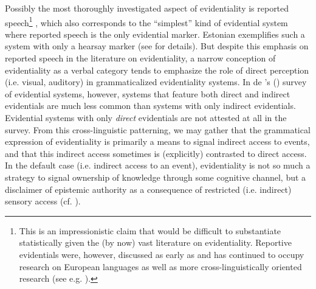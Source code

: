 \documentclass[output=paper]{langsci/langscibook}
\begin{document}
Possibly the most thoroughly investigated aspect of evidentiality is reported speech\footnote{This is an impressionistic claim that would be difficult to substantiate statistically given the (by now) vast literature on evidentiality. Reportive evidentials were, however, discussed as early as \cite{Jakobson1957} and has continued to occupy research on European languages as well as more cross-linguistically oriented research (see e.g. \citealt{Boye2012}).}
, which also corresponds to the “simplest” kind of evidential system where reported speech is the only evidential marker. Estonian exemplifies such a system with only a hearsay marker (see \citealt{Aikhenvald2004} for details). But despite this emphasis on reported speech in the literature on evidentiality, a narrow conception of evidentiality as a verbal category tends to emphasize the role of direct perception (i.e. visual, auditory) in grammaticalized evidentiality systems. In de \citeauthor{Haan2013}’s (\citeyear{Haan2013}) survey of evidential systems, however, systems that feature both direct and indirect evidentials are much less common than systems with only indirect evidentials. Evidential systems with only \emph{direct} evidentials are not attested at all in the survey. From this cross-linguistic patterning, we may gather that the grammatical expression of evidentiality is primarily a means to signal indirect access to events, and that this indirect access sometimes is (explicitly) contrasted to direct access. In the default case (i.e. indirect access to an event), evidentiality is not so much a strategy to signal ownership of knowledge through some cognitive channel, but a disclaimer of epistemic authority as a consequence of restricted (i.e. indirect) sensory access (cf. \citealt{Mushin2001}). 
\end{document}
